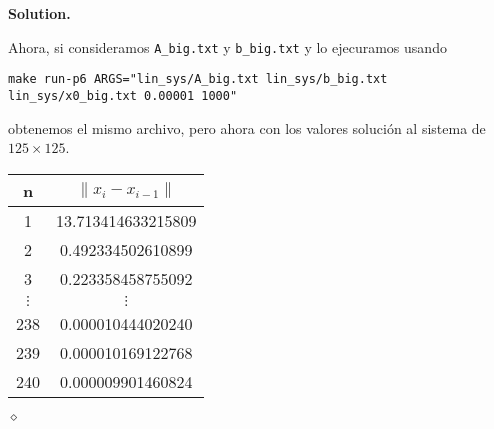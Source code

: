 \documentclass{article}
\theoremstyle{problemstyle}
\newenvironment{solution}{%
  \begin{mdframed}[linewidth=0.8pt,linecolor=Gray,backgroundcolor=Gray!5,roundcorner=5pt]%
  \noindent\textbf{Solution.}%
}{%
\hfill $ \diamond $ 
  \end{mdframed}%
}
\begin{document}
\begin{solution}
	Ahora, si consideramos \texttt{A\_big.txt} y \texttt{b\_big.txt} y lo ejecuramos usando
	\begin{center}
		\texttt{make run-p6 ARGS="lin\_sys/A\_big.txt lin\_sys/b\_big.txt lin\_sys/x0\_big.txt 0.00001 1000"}
	\end{center}
	obtenemos el mismo archivo, pero ahora con los valores soluci\'on al sistema de $ 125\times 125 $.
	\begin{table}[H]
		\begin{center}
			\begin{tabular}[H]{c|c}
				n        & $ \lVert x_i - x_{i-1}\rVert $ \\
				\hline
        1& 13.713414633215809\\
        2& 0.492334502610899\\
        3& 0.223358458755092\\
				$\vdots$ & $ \vdots $                     \\
        238& 0.000010444020240\\
        239& 0.000010169122768\\
        240& 0.000009901460824
			\end{tabular}
		\end{center}
	\end{table}
\end{solution}



\end{document}
